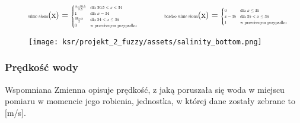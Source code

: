 \documentclass{article}
\begin{document}
\begin{equation*}
\begin{minipage}{0.5\textwidth}
\centering
\text{\scalebox{0.5}{silnie słona}}(x) = \scalebox{0.5}{$
\begin{cases} 
\frac{x - 30.5}{3.5} & \text{dla } 30.5 < x < 34 \\
1 & \text{dla } x = 34 \\
\frac{36 - x}{2} & \text{dla } 34 < x \leq 36 \\
0 & \text{w przeciwnym przypadku}
\end{cases}
$}
\end{minipage}%
\begin{minipage}{0.5\textwidth}
\centering
\text{\scalebox{0.5}{bardzo silnie słona}}(x) = \scalebox{0.5}{$
\begin{cases} 
0 & \text{dla } x \leq 35 \\
x - 35 & \text{dla } 35 < x \leq 36 \\
1 & \text{w przeciwnym przypadku}
\end{cases}
$}
\end{minipage}
\end{equation*}



\begin{figure}[H]
\centering
\texttt{[image: ksr/projekt\_2\_fuzzy/assets/salinity\_bottom.png]}
\label{fig:epsilon_bat}
\end{figure}

\subsubsection{Prędkość wody}

\noindent Wspomniana Zmienna opisuje prędkość, z jaką poruszała się woda w miejscu pomiaru w momencie jego robienia, jednostka, w której dane zostały zebrane to [m/s].
\end{document}
